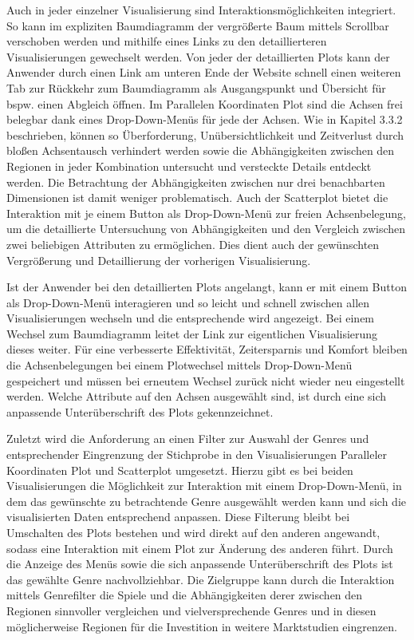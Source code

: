 \documentclass[usegeometry=true]{scrartcl}
\begin{document}
Auch in jeder einzelner Visualisierung sind Interaktionsmöglichkeiten integriert. 
So kann im expliziten Baumdiagramm der vergrößerte Baum mittels Scrollbar verschoben werden und mithilfe eines Links zu den detaillierteren Visualisierungen gewechselt werden.
Von jeder der detaillierten Plots kann der Anwender durch einen Link am unteren Ende der Website schnell einen weiteren Tab zur Rückkehr zum Baumdiagramm als Ausgangspunkt und Übersicht für bspw. einen Abgleich öffnen.
Im Parallelen Koordinaten Plot sind die Achsen frei belegbar dank eines Drop-Down-Menüs für jede der Achsen. 
Wie in Kapitel 3.3.2 beschrieben, können so Überforderung, Unübersichtlichkeit und Zeitverlust durch bloßen Achsentausch verhindert werden sowie die Abhängigkeiten zwischen den Regionen in jeder Kombination untersucht und versteckte Details entdeckt werden. 
Die Betrachtung der Abhängigkeiten zwischen nur drei benachbarten Dimensionen ist damit weniger problematisch.
Auch der Scatterplot bietet die Interaktion mit je einem Button als Drop-Down-Menü zur freien Achsenbelegung, um die detaillierte Untersuchung von Abhängigkeiten und den Vergleich zwischen zwei beliebigen Attributen zu ermöglichen.
Dies dient auch der gewünschten Vergrößerung und Detaillierung der vorherigen Visualisierung.

Ist der Anwender bei den detaillierten Plots angelangt, kann er mit einem Button als Drop-Down-Menü interagieren und so leicht und schnell zwischen allen Visualisierungen wechseln und die entsprechende wird angezeigt.
Bei einem Wechsel zum Baumdiagramm leitet der Link zur eigentlichen Visualisierung dieses weiter. 
Für eine verbesserte Effektivität, Zeitersparnis und Komfort bleiben die Achsenbelegungen bei einem Plotwechsel mittels Drop-Down-Menü gespeichert und müssen bei erneutem Wechsel zurück nicht wieder neu eingestellt werden. 
Welche Attribute auf den Achsen ausgewählt sind, ist durch eine sich anpassende Unterüberschrift des Plots gekennzeichnet. 

Zuletzt wird die Anforderung an einen Filter zur Auswahl der Genres und entsprechender Eingrenzung der Stichprobe in den Visualisierungen Paralleler Koordinaten Plot und Scatterplot umgesetzt.
Hierzu gibt es bei beiden Visualisierungen die Möglichkeit zur Interaktion mit einem Drop-Down-Menü, in dem das gewünschte zu betrachtende Genre ausgewählt werden kann und sich die visualisierten Daten entsprechend anpassen.
Diese Filterung bleibt bei Umschalten des Plots bestehen und wird direkt auf den anderen angewandt, sodass eine Interaktion mit einem Plot zur Änderung des anderen führt. 
Durch die Anzeige des Menüs sowie die sich anpassende Unterüberschrift des Plots ist das gewählte Genre nachvollziehbar.
Die Zielgruppe kann durch die Interaktion mittels Genrefilter die Spiele und die Abhängigkeiten derer zwischen den Regionen sinnvoller vergleichen und vielversprechende Genres und in diesen möglicherweise Regionen für die Investition in weitere Marktstudien eingrenzen.
\end{document}
